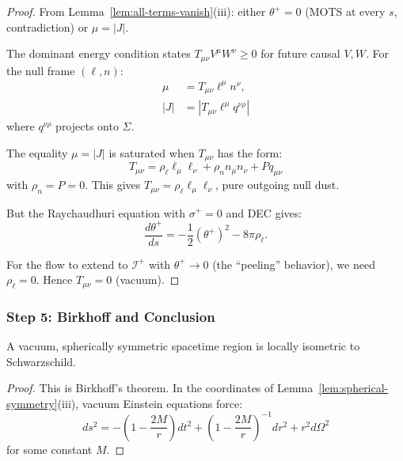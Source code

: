 \begin{proof}
From Lemma~\ref{lem:all-terms-vanish}(iii): either $\theta^+ = 0$ (MOTS at every $s$, contradiction) or $\mu = |J|$.

The dominant energy condition states $T_{\mu\nu}V^\mu W^\nu \geq 0$ for future causal $V, W$. For the null frame $(\ell, n)$:
\begin{align}
\mu &= T_{\mu\nu} \ell^\mu n^\nu, \\
|J| &= |T_{\mu\nu} \ell^\mu q^{\nu\rho}|
\end{align}
where $q^{\nu\rho}$ projects onto $\Sigma$.

The equality $\mu = |J|$ is saturated when $T_{\mu\nu}$ has the form:
\begin{equation}
T_{\mu\nu} = \rho_\ell \ell_\mu \ell_\nu + \rho_n n_\mu n_\nu + P q_{\mu\nu}
\end{equation}
with $\rho_n = P = 0$. This gives $T_{\mu\nu} = \rho_\ell \ell_\mu \ell_\nu$, pure outgoing null dust.

But the Raychaudhuri equation with $\sigma^+ = 0$ and DEC gives:
\begin{equation}
\frac{d\theta^+}{ds} = -\frac{1}{2}(\theta^+)^2 - 8\pi \rho_\ell.
\end{equation}

For the flow to extend to $\mathscr{I}^+$ with $\theta^+ \to 0$ (the ``peeling'' behavior), we need $\rho_\ell = 0$. Hence $T_{\mu\nu} = 0$ (vacuum).
\end{proof}

\subsubsection{Step 5: Birkhoff and Conclusion}

\begin{lemma}
\label{lem:birkhoff}
A vacuum, spherically symmetric spacetime region is locally isometric to Schwarzschild.
\end{lemma}

\begin{proof}
This is Birkhoff's theorem. In the coordinates of Lemma~\ref{lem:spherical-symmetry}(iii), vacuum Einstein equations force:
\begin{equation}
ds^2 = -\left(1 - \frac{2M}{r}\right)dt^2 + \left(1 - \frac{2M}{r}\right)^{-1}dr^2 + r^2 d\Omega^2
\end{equation}
for some constant $M$.
\end{proof}

